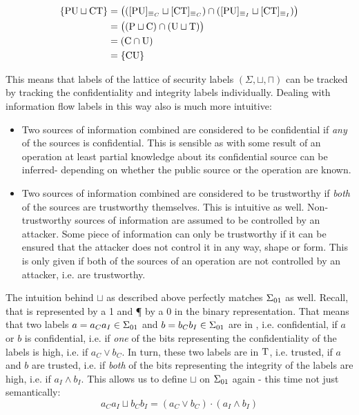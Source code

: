 \begin{example}
    \begin{align*}
        \{ \text{PU} \sqcup \text{CT} \} &= \big(([\text{PU}]_{\equiv_C} \sqcup [\text{CT}]_{\equiv_C}) \cap ([\text{PU}]_{\equiv_I} \sqcup [\text{CT}]_{\equiv_I}) \big) \\
        &= \big((\text{P} \sqcup \text{C}) \cap (\text{U} \sqcup \text{T}) \big) \\
        &= (\text{C} \cap \text{U}) \\
        &= \{ \text{CU} \}
    \end{align*}
\end{example}

This means that labels of the lattice of security labels $ (\Sigma, \sqcup, \sqcap) $ can be tracked by tracking the confidentiality and integrity labels individually.
Dealing with information flow labels in this way also is much more intuitive:
\begin{itemize}
    \item Two sources of information combined are considered to be confidential if \textit{any} of the sources is confidential.
    This is sensible as with some result of an operation at least partial knowledge about its confidential source can be inferred- depending on whether the public source or the operation are known.
    \item Two sources of information combined are considered to be trustworthy if \textit{both} of the sources are trustworthy themselves.
    This is intuitive as well.
    Non-trustworthy sources of information are assumed to be controlled by an attacker.
    Some piece of information can only be trustworthy if it can be ensured that the attacker does not control it in any way, shape or form.
    This is only given if both of the sources of an operation are not controlled by an attacker, i.e. are trustworthy.
\end{itemize}

The intuition behind $ \sqcup $ as described above perfectly matches $ \Sigma_{01} $ as well.
Recall, that \C{} is represented by a 1 and \P{} by a 0 in the binary representation.
That means that two labels $ a = a_Ca_I \in \Sigma_{01} $ and $ b = b_Cb_I \in \Sigma_{01} $ are in \C{}, i.e. confidential, if $ a $ or $ b $ is confidential, i.e. if \textit{one} of the bits representing the confidentiality of the labels is high, i.e. if $ a_C \lor b_C $.
In turn, these two labels are in $ \text{T} $, i.e. trusted, if $ a $ and $ b $ are trusted, i.e. if \textit{both} of the bits representing the integrity of the labels are high, i.e. if $ a_I \land b_I $.
This allows us to define $ \sqcup $ on $ \Sigma_{01} $ again - this time not just semantically:
\begin{equation*}
    a_C a_I \sqcup b_C b_I = (a_C \lor b_C) \cdot (a_I \land b_I)
\end{equation*}

